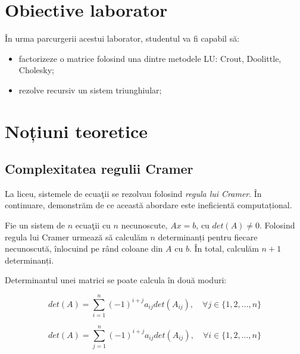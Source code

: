 \documentclass{exam}
\title{
\textmd{\textbf{\MNLabTitle}}
\author{}
\date{}
}
\begin{document}
\begin{coverpages}
	\maketitle
	\thispagestyle{empty}
	\tableofcontents
\end{coverpages}

\section{Obiective laborator}

\par În urma parcurgerii acestui laborator, studentul va fi capabil să:
\begin{itemize}
	\item factorizeze o matrice folosind una dintre metodele LU: Crout,
	      Doolittle, Cholesky;
	\item rezolve recursiv un sistem triunghiular;
\end{itemize}

\section{Noțiuni teoretice}

\subsection{Complexitatea regulii Cramer}

\par La liceu, sistemele de ecuaţii se rezolvau folosind
\textit{regula lui Cramer}. În continuare, demonstrăm de ce această abordare
este ineficientă computațional.

\par Fie un sistem de $n$ ecuaţii cu $n$ necunoscute, $Ax = b$, cu $det(A) \neq 0$.
Folosind regula lui Cramer urmează să calculăm $n$ determinanți pentru fiecare
necunoscută, înlocuind pe rând coloane din $A$ cu $b$. În total, calculăm
$n + 1$ determinanți.

\par Determinantul unei matrici se poate calcula în două moduri:

\begin{equation}
	det(A) = \sum_{i = 1}^{n}{(-1)^{i + j} a_{ij} det(A_{ij})}, \quad \forall j \in \{1, 2, \ldots, n\}
\end{equation}

\begin{equation}
	det(A) = \sum_{j = 1}^{n}{(-1)^{i + j} a_{ij} det(A_{ij})}, \quad \forall i \in \{1, 2, \ldots, n\}
\end{equation}
\end{document}
